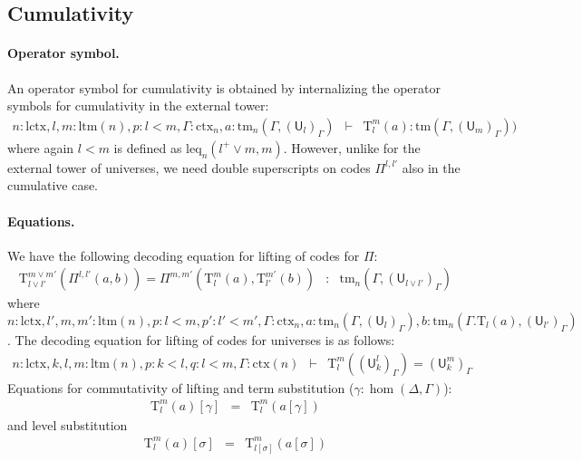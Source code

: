 \documentclass[11pt,a4paper]{article}
\theoremstyle{plain}
\theoremstyle{definition}
\newcommand{\UU}{\mathsf{U}}
\def\UU{\mathsf{U}}
\newcommand{\N}{\mathsf{N}}
\def\lctx{\mathrm{lctx}}
\def\ltm{\mathrm{ltm}}
\def\leq{\mathrm{leq}}
\newcommand{\ctx}{\mathrm{ctx}}
\newcommand{\tm}{\mathrm{tm}}
\def\U{\mathsf{U}}
\newcommand{\Ta}{\mathrm{T}}
\begin{document}
\subsection{Cumulativity} 
\paragraph{Operator symbol.}
An operator symbol for cumulativity is obtained by internalizing the operator symbols for cumulativity in the external tower:
\begin{eqnarray*}
n : \lctx, l,m : \ltm(n), p : l < m, \Gamma : \ctx_n, a : \tm_n(\Gamma,(\U_{l})_\Gamma) &\vdash& {\Ta^m_{l}}(a) : \tm(\Gamma,(\U_{m})_\Gamma))
\end{eqnarray*}
where again $l < m$ is defined as $\leq_n(l^+ \vee m, m)$. However, unlike for the external tower of universes, we need double superscripts on codes $\Pi^{l,l'}$ also in the cumulative case. 

\paragraph{Equations.}
We have the following decoding equation for lifting of codes for $\Pi$:
\begin{eqnarray*}
\Ta^{m \vee m'}_{l \vee l'}(\Pi^{l,l'}(a,b)) = \Pi^{m,m'}(\Ta^m_l(a),\Ta^{m'}_{l'}(b)) &:& \tm_n(\Gamma,(\UU_{l \vee l'})_\Gamma)
\end{eqnarray*}
where $n: \lctx,l',m,m' : \ltm(n), p: l < m, p': l' < m', \Gamma : \ctx_n, a : \tm_n(\Gamma,(\UU_l)_\Gamma), b : \tm_n(\Gamma.\Ta_l(a),(\UU_{l'})_\Gamma)$.
The decoding equation for lifting of codes for universes is as follows:
\begin{eqnarray*}
n : \lctx, k, l, m : \ltm(n), p : k < l, q : l < m, \Gamma : \ctx(n) &\vdash& \Ta^m_l((\UU^l_k)_\Gamma) = (\UU^m_k)_\Gamma
\end{eqnarray*}
Equations for commutativity of lifting and term substitution ($\gamma : \hom(\Delta,\Gamma)$):
\begin{eqnarray*}
\Ta^m_l(a) [ \gamma ] &=& \Ta^m_l(a[ \gamma ] )
\end{eqnarray*}
and level substitution
\begin{eqnarray*}
\Ta^m_l(a) [ \sigma ] &=& \Ta^m_{l[\sigma]}(a[ \sigma ] )
\end{eqnarray*}
\end{document}

